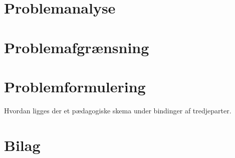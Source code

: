 \documentclass[12pt,hidelinks]{article}
\begin{document}
	\section{Problemanalyse}
	
	
	
	
	\section{Problemafgrænsning}
    \section{Problemformulering}
    Hvordan ligges der et pædagogiske skema under bindinger af tredjeparter.
    \section{Bilag}
    
    
    
	
	
\end{document}
